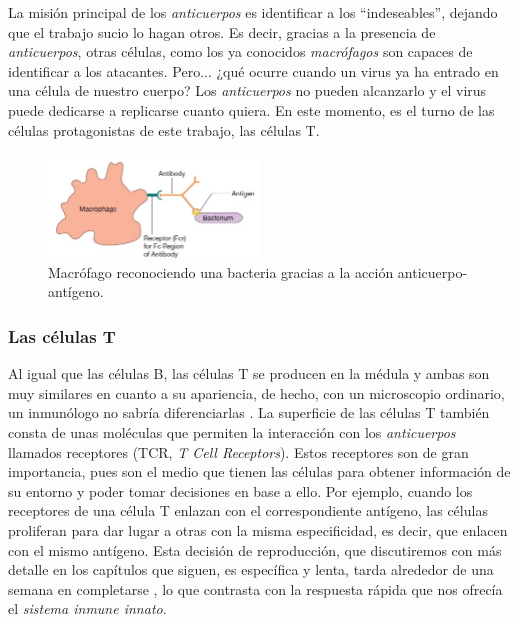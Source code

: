 La misión principal de los \textit{anticuerpos} es identificar a los ``indeseables'', dejando que el trabajo sucio lo hagan otros. Es decir, gracias a la presencia de \textit{anticuerpos}, otras células, como los ya conocidos \textit{macrófagos} son capaces de identificar a los atacantes. Pero... ¿qué ocurre cuando un virus ya ha entrado en una célula de nuestro cuerpo? Los \textit{anticuerpos} no pueden alcanzarlo y el virus puede dedicarse a replicarse cuanto quiera. En este momento, es el turno de las células protagonistas de este trabajo, las células T. 


\begin{figure}[t]
	\centering
	\includegraphics[width=0.5\textwidth]{2_macrofago_anticuerpo}
	\caption{Macrófago reconociendo una bacteria gracias a la acción anticuerpo-antígeno.}
	\label{fig:macrofago_anticuerpo}
\end{figure}


\subsubsection{Las células T}
\label{Tcell}
Al igual que las células B, las células T se producen en la médula y ambas son muy similares en  cuanto a su apariencia, de hecho, con un microscopio ordinario, un inmunólogo no sabría diferenciarlas \citep{theHowItWorks}.  La superficie de las células T también consta de unas moléculas que permiten la interacción con los \textit{anticuerpos} llamados receptores (TCR, \textit{T Cell Receptors}). Estos receptores son de gran importancia, pues son el medio que tienen las células para obtener información de su entorno y poder tomar decisiones en base a ello. Por ejemplo, cuando los receptores de una célula T enlazan con el correspondiente antígeno, las células proliferan para dar lugar a otras con la misma especificidad, es decir, que enlacen con el mismo antígeno. Esta decisión de reproducción, que discutiremos con más detalle en los capítulos que siguen, es específica y lenta, tarda alrededor de una semana en completarse \citep{theHowItWorks}, lo que contrasta con la respuesta rápida que nos ofrecía el \textit{sistema inmune innato}.

